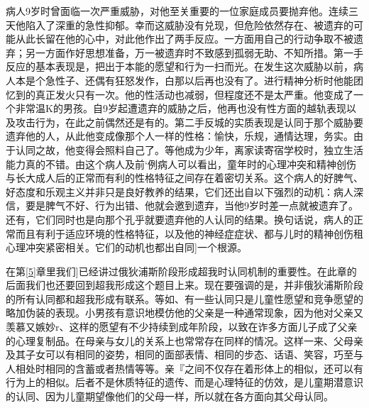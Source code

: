 \documentclass[UTF8,10pt,a4paper,openany]{book}
\begin{document}
病人9岁时曾面临一次严重威胁，对他至关重要的一位家庭成员要抛弃他。连续三天他陷入了深重的急性抑郁。幸而这威胁没有兑现，但危险依然存在、被遗弃的可能从此长留在他的心中，对此他作出了两手反应。一方面用自己的行动争取不被遗弃；另一方面作好思想准备，万一被遗弃时不致感到孤弱无助、不知所措。第一手反应的基本表现是，把出于本能的愿望和行为一扫而光。在发生这次威胁以前，病人本是个急性子、还偶有狂怒发作，白那以后再也没有了。进行精神分析时他能团忆到的真正发火只有一次。他的性活动也减弱，但程度还不是太严重。他变成了一个非常温K的男孩。自9岁起遭遗弃的威胁之后，他再也没有性方面的越轨表现以及攻击行为，在此之前偶然还是有的。第二手反城的实质表现是认同于那个威胁要遗弃他的人，从此他变成像那个人一样的性格：愉快，乐规，通情达理，务实。由于认同之故，他变得会照料自己了。等他成为少年，离家读寄宿学校时，独立生活能力真的不错。由这个病人及前‘例病人可以看出，童年时的心理冲突和精神创伤与长大成人后的正常而有利的性格特征之间存在着密切关系。这个病人的好脾气、好态度和乐观主义并非只是良好教养的结果，它们还出自以下强烈的动机：病人深信，要是脾气不好、行为出错、他就会邀到遗弃，当他9岁时差一点就被遗弃了。还有，它们同时也是向那个孔乎就要遗弃他的人认同的结果。换句话说，病人的正常而且有利于适应环境的性格特征，以及他的神经症症状、都与儿时的精神创伤租心理冲突紧密相关。它们的动机也都出自同]一个根源。

在第\ref{5}章里我们]已经讲过俄狄浦斯阶段形成超我时认同机制的重要性。在此章的后面我们也还要回到超我形成这个题目上来。现在要强调的是，并非俄狄浦斯阶段的所有认同都和超我形成有联系。等如、有一些认同只是儿童性愿望和竞争愿望的略加伪装的表现。小男孩有意识地模仿他的父亲是一种通常现象，因为他对父亲又羡慕又嫉妙r、这样的愿望有不少持续到成年阶段，以致在诈多方面儿子成了父亲的心理复制品。在母亲与女儿的关系上也常常存在同样的情况。这样一来、父母亲及其子女可以有相同的姿势，相同的面部表情、相同的步态、话语、笑容，巧至与人相处时相同的含蓄或者热情等等。亲『之间不仅存在着形体上的相似，还可以有行为上的相似。后者不是休质特征的遗传、而是心理特征的仿效，是儿童期潜意识的认同、因为儿童期望像他们的父母一样，所以就在各方面向其父母认同。
\end{document}
